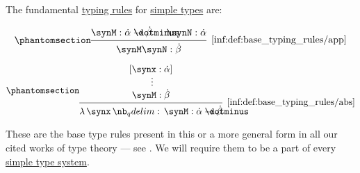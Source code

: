 \begin{definition}\label{def:base_typing_rules}
  The fundamental \hyperref[def:type_derivation_tree]{typing rules} for \hyperref[def:simple_type]{simple types} are:
  \begin{paracol}{2}
    \begin{leftcolumn}
      \begin{equation*}\taglabel[\ensuremath{ \logic{App}_\tau }]{inf:def:base_typing_rules/app}
        \begin{prooftree}
          \hypo{ \synM: \syn\alpha \synimplies \syn\beta }
          \hypo{ \synN: \syn\alpha }
          \infer2[\ref{inf:def:base_typing_rules/app}]{ \synM \synN: \syn\beta }
        \end{prooftree}
      \end{equation*}
    \end{leftcolumn}

    \begin{rightcolumn}
      \begin{equation*}\taglabel[\ensuremath{ \logic{Abs}_\tau }]{inf:def:base_typing_rules/abs}
        \begin{prooftree}
          \hypo{ [\synx: \syn\alpha] }
          \ellipsis {} { \synM: \syn\beta }
          \infer1[\ref{inf:def:base_typing_rules/abs}]{ \qabs \synx \synM: \syn\alpha \synimplies \syn\beta }
        \end{prooftree}
      \end{equation*}
    \end{rightcolumn}
  \end{paracol}
\end{definition}
\begin{comments}
  \item These are the base type rules present in this or a more general form in all our cited works of type theory --- see . We will require them to be a part of every \hyperref[def:simple_type_system]{simple type system}.
\end{comments}

